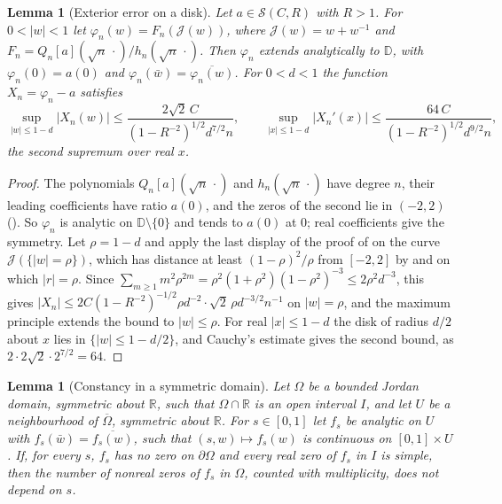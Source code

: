 \documentclass[11pt]{amsart}
\newtheorem{lemma}[theorem]{Lemma}
\theoremstyle{definition}
\theoremstyle{remark}
\numberwithin{equation}{section}
\newcommand{\R}{\mathbb{R}}
\newcommand{\D}{\mathbb{D}}
\begin{document}
\begin{lemma}[Exterior error on a disk]\label{lem:ext-disk}
Let $a\in\mathcal S(C,R)$ with $R>1$. For $0<|w|<1$ let $\varphi_n(w)=F_n(\mathcal J(w))$, where $\mathcal J(w)=w+w^{-1}$ and $F_n=Q_n[a](\sqrt n\,\cdot)/h_n(\sqrt n\,\cdot)$. Then $\varphi_n$ extends analytically to $\D$, with $\varphi_n(0)=a(0)$ and $\varphi_n(\bar w)=\overline{\varphi_n(w)}$. For $0<d<1$ the function $X_n=\varphi_n-a$ satisfies
\[
\sup_{|w|\le1-d}|X_n(w)|\le\frac{2\sqrt2\,C}{(1-R^{-2})^{1/2}d^{7/2}n},\qquad\sup_{|x|\le1-d}|X_n'(x)|\le\frac{64\,C}{(1-R^{-2})^{1/2}d^{9/2}n},
\]
the second supremum over real $x$.
\end{lemma}

\begin{proof}
The polynomials $Q_n[a](\sqrt n\,\cdot)$ and $h_n(\sqrt n\,\cdot)$ have degree $n$, their leading coefficients have ratio $a(0)$, and the zeros of the second lie in $(-2,2)$ (\cite[Lemma~\ref{M-lem:resolvent}]{Main}). So $\varphi_n$ is analytic on $\D\setminus\{0\}$ and tends to $a(0)$ at $0$; real coefficients give the symmetry. Let $\rho=1-d$ and apply the last display of the proof of \cite[Proposition~\ref{M-prop:exterior}]{Main} on the curve $\mathcal J(\{|w|=\rho\})$, which has distance at least $(1-\rho)^2/\rho$ from $[-2,2]$ by \cite[\eqref{M-eq:joukowski-dist}]{Main} and on which $|r|=\rho$. Since $\sum_{m\ge1}m^2\rho^{2m}=\rho^2(1+\rho^2)(1-\rho^2)^{-3}\le2\rho^2d^{-3}$, this gives $|X_n|\le2C(1-R^{-2})^{-1/2}\rho d^{-2}\cdot\sqrt2\,\rho d^{-3/2}n^{-1}$ on $|w|=\rho$, and the maximum principle extends the bound to $|w|\le\rho$. For real $|x|\le1-d$ the disk of radius $d/2$ about $x$ lies in $\{|w|\le1-d/2\}$, and Cauchy's estimate gives the second bound, as $2\cdot2\sqrt2\cdot2^{7/2}=64$.
\end{proof}

\begin{lemma}[Constancy in a symmetric domain]\label{lem:constancy-region}
Let $\Omega$ be a bounded Jordan domain, symmetric about $\R$, such that $\Omega\cap\R$ is an open interval $I$, and let $U$ be a neighbourhood of $\overline\Omega$, symmetric about $\R$. For $s\in[0,1]$ let $f_s$ be analytic on $U$ with $f_s(\bar w)=\overline{f_s(w)}$, such that $(s,w)\mapsto f_s(w)$ is continuous on $[0,1]\times U$. If, for every $s$, $f_s$ has no zero on $\partial\Omega$ and every real zero of $f_s$ in $I$ is simple, then the number of nonreal zeros of $f_s$ in $\Omega$, counted with multiplicity, does not depend on $s$.
\end{lemma}
\end{document}

